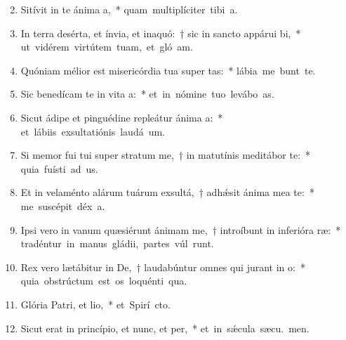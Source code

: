 \begin{flushleft}
\begin{enumerate}[leftmargin=*]
\setcounter{enumi}{1}


\item Sitívit in te ánima a,~* \mbox{quam multiplíciter tibi  a.}
\item In terra desérta, et ínvia, et inaquó:~† sic in sancto appárui bi,~* \mbox{ut vidérem virtútem tuam, et gló am.}
\item Quóniam mélior est misericórdia tua super tas:~* \mbox{lábia me bunt te.}
\item Sic benedícam te in vita a:~* \mbox{et in nómine tuo levábo  as.}
\item Sicut ádipe et pinguédine repleátur ánima a:~* \mbox{et lábiis exsultatiónis laudá  um.}
\item Si memor fui tui super stratum me,~† in matutínis meditábor  te:~* \mbox{quia fuísti ad us.}
\item Et in velaménto alárum tuárum exsultá,~† adh\'{\ae}sit ánima mea  te:~* \mbox{me suscépit déx a.}
\item Ipsi vero in vanum quæsiérunt ánimam me,~† introíbunt in inferióra ræ:~* \mbox{tradéntur in manus gládii, partes vúl runt.}
\item Rex vero lætábitur in De,~† laudabúntur omnes qui jurant in o:~* \mbox{quia obstrúctum est os loquénti qua.}
\item Glória Patri, et lio,~* \mbox{et Spirí cto.}
\item Sicut erat in princípio, et nunc, et per,~* \mbox{et in s\'{\ae}cula sæcu. men.}

\end{enumerate}
\end{flushleft}

